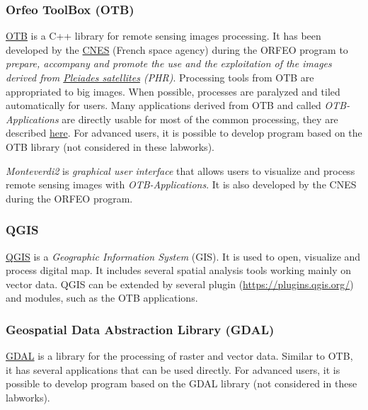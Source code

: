 \documentclass[a4paper,11pt,DIV=18]{scrartcl}
\begin{document}
\subsubsection{Orfeo ToolBox (OTB)}
\label{sec:org85cb224}
\href{https://www.orfeo-toolbox.org/}{OTB} is a C++ library for remote sensing images processing. It has been
developed by the  \href{https://cnes.fr/en}{CNES} (French space agency) during  the ORFEO program
to \emph{prepare, accompany and promote the use and the exploitation of the
images derived from \href{https://en.wikipedia.org/wiki/Pleiades\_\%28satellite\%29}{Pleiades satellites} (PHR)}.  Processing tools from
OTB  are appropriated  to big  images.  When  possible, processes  are
paralyzed and tiled automatically for users. Many applications derived
from OTB and  called \emph{OTB-Applications} are directly usable  for most of
the common processing, they are described \href{https://www.orfeo-toolbox.org/CookBook/CookBook.html}{here}. For advanced users, it
is  possible  to  develop  program  based  on  the  OTB  library  (not
considered in these labworks).

\emph{Monteverdi2} is \emph{graphical user interface} that allows users to visualize
and process  remote sensing images  with \emph{OTB-Applications}. It  is also
developed by the CNES during the ORFEO program. 

\subsubsection{QGIS}
\label{sec:orgf290134}
\href{http://www.qgis.org/en/site/}{QGIS} is  a \emph{Geographic Information System}  (GIS).  It is used  to open,
visualize  and  process  digital  map.  It  includes  several  spatial
analysis tools working mainly on vector  data. QGIS can be extended by
several plugin  (\url{https://plugins.qgis.org/}) and  modules, such  as the
OTB applications.

\subsubsection{Geospatial Data Abstraction Library (GDAL)}
\label{sec:orgbc64fa4}
\href{http://www.gdal.org/}{GDAL}  is   a  library  for   the  processing  of  raster   and  vector
data. Similar  to OTB, it  has several  applications that can  be used
directly. For advanced users, it  is possible to develop program based
on the GDAL library (not considered in these labworks).
\end{document}
